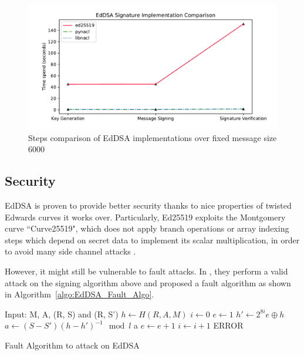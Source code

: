 \documentclass[10pt,sigconf]{acmart}
\begin{document}
\begin{figure}
\centering
\includegraphics[scale=0.45]{EdDSA_Implementation_Compare_Steps}
\caption{\small{Steps comparison of EdDSA implementations over fixed message size 6000}}
\label{fig:EdDSA_Implementation_Compare_Steps}
\end{figure}

\subsection{Security}

EdDSA is proven to provide better security thanks to nice properties of twisted Edwards curves it works over. Particularly, Ed25519 exploits the Montgomery curve ``Curve25519", which does not apply branch operations or array indexing steps which depend on secret data to implement its scalar multiplication, in order to avoid many side channel attacks \cite{8167706}.

However, it might still be vulnerable to fault attacks. In \cite{8167706}, they perform a valid attack on the signing algorithm above and proposed a fault algorithm as shown in Algorithm~\ref{algo:EdDSA_Fault_Algo}.

\begin{algorithm}
\begin{algorithmic}
\STATE Input: M, A, (R, S) and (R, S')
\STATE $h \gets H(R, A, M)$ 
\STATE $i \gets 0$
    \STATE $e \gets  1$
        \STATE $h' \gets  2^{8i} e \oplus h$
        \STATE $a \gets (S - S')(h - h')^{-1} \mod l$
        \RETURN a
        \ENDIF
        \STATE $e \gets  e + 1$
    \ENDFOR
    \STATE $i \gets i + 1$
\ENDFOR
\RETURN ERROR
\end{algorithmic}
\caption{Fault Algorithm to attack on EdDSA}
\label{algo:EdDSA_Fault_Algo}
\end{algorithm}
\end{document}
